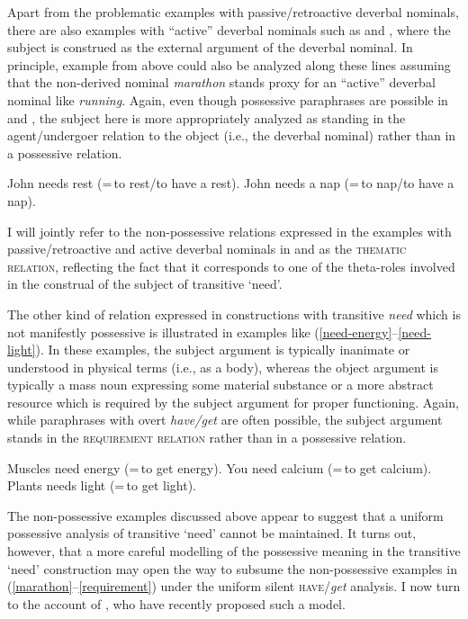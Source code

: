 \documentclass[output=paper]{langscibook}
\begin{document}
\noindent Apart from the problematic examples with passive/retroactive deverbal nominals, there are also examples with ``active'' deverbal nominals such as  and , where the subject is construed as the external argument of the deverbal nominal. In principle,  example  from above could also be analyzed along these lines assuming that the non-derived nominal \textit{marathon} stands proxy for an ``active'' deverbal nominal like \textit{running}. Again, even though possessive paraphrases are possible in  and , the subject here is more appropriately analyzed as standing in the agent/undergoer relation to the object (i.e., the deverbal nominal) rather than in a possessive relation.

\ea\label{active}
\ea John needs rest (=\,to rest/to have a rest).\label{need-rest}
\ex  John needs a nap (=\,to nap/to have a nap).\label{need-nap}
\z\z

\noindent I will jointly refer to the non-possessive relations expressed in the examples with passive/retroactive and active deverbal nominals in  and  as the \textsc{thematic relation}, reflecting the fact that it corresponds to one of the theta-roles involved in the construal of the subject of transitive `need'.

The other kind of relation expressed in constructions with transitive \textit{need} which is not manifestly possessive is illustrated in examples like (\ref{need-energy}--\ref{need-light}). In these examples, the subject argument is typically inanimate or understood in physical terms (i.e., as a body), whereas the object argument is typically a mass noun expressing some material substance or a more abstract resource which is required by the subject argument for proper functioning. Again, while paraphrases with overt \textit{have/get} are often possible, the subject argument stands in the \textsc{requirement relation} rather than in a possessive relation.


\ea\label{requirement}
\ea Muscles need energy (=\,to get energy).\label{need-energy}
\ex You need calcium (=\,to get calcium).\label{need-calcium}
\ex Plants needs light (=\,to get light).\label{need-light}
\z\z

\noindent The non-possessive examples discussed above appear to suggest that a uniform possessive analysis of transitive `need' cannot be maintained. It turns out, however, that a more careful modelling of the possessive meaning in the transitive `need' construction may open the way to subsume the non-possessive examples in (\ref{marathon}--\ref{requirement}) under the uniform silent \textsc{have}/\textit{get} analysis. I now turn to the account of \citet{Zaroukian.Beller2013}, who have recently proposed such a model.
\end{document}
